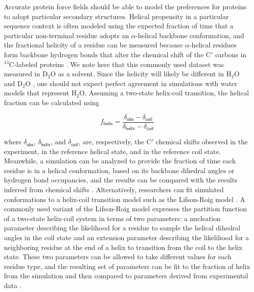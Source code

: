 \documentclass[9pt,review,pubversion]{livecoms}
\begin{document}
Accurate protein force fields should be able to model the preferences for proteins to adopt particular secondary structures.
Helical propensity in a particular sequence context is often modeled using the expected fraction of time that a particular non-terminal residue adopts an $\alpha$-helical backbone conformation, and the fractional helicity of a residue can be measured because $\alpha$-helical residues form backbone hydrogen bonds that alter the chemical shift of the C$'$ carbons in $^{13}$C-labeled proteins \cite{shalongo_distribution_1994}.
We note here that this commonly used dataset was measured in D$_2$O as a solvent.
Since the helicity will likely be different in H$_2$O and D$_2$O \cite{shi2002d}, one should not expect perfect agreement in simulations with water models that represent H$_2$O.
Assuming a two-state helix-coil transition, the helical fraction can be calculated using

\begin{equation}
\label{eqn:fraction_helix}
f_{\mathsf{helix}} = \frac {\delta_{\mathsf{obs}} - \delta_{\mathsf{coil}}} {\delta_{\mathsf{helix}} - \delta_{\mathsf{coil}}}
\end{equation}

\noindent where $\delta_{\mathsf{obs}}$,  $\delta_{\mathsf{helix}}$, and $\delta_{\mathsf{coil}}$, are, respectively, the C$'$ chemical shifts observed in the experiment, in the reference helical state, and in the reference coil state.
Meanwhile, a simulation can be analyzed to provide the fraction of time each residue is in a helical conformation, based on its backbone dihedral angles or hydrogen bond occupancies, and the results can be compared with the results inferred from chemical shifts \cite{best_optimized_2009}.
Alternatively, researchers can fit simulated conformations to a helix-coil transition model such as the Lifson-Roig model \cite{lifson_theory_1961}.
A commonly used variant of the Lifson-Roig model expresses the partition function of a two-state helix-coil system in terms of two parameters: a nucleation parameter describing the likelihood for a residue to sample the helical dihedral angles in the coil state and an extension parameter describing the likelihood for a neighboring residue at the end of a helix to transition from the coil to the helix state.
These two parameters can be allowed to take different values for each residue type, and the resulting set of parameters can be fit to the fraction of helix from the simulation and then compared to parameters derived from experimental data \cite{best_optimized_2009}.
\end{document}
